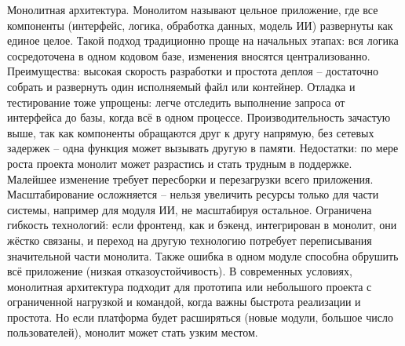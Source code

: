 Монолитная архитектура. Монолитом называют цельное приложение, где все компоненты (интерфейс, логика, обработка данных, модель ИИ) развернуты как единое целое. Такой подход традиционно проще на начальных этапах: вся логика сосредоточена в одном кодовом базе, изменения вносятся централизованно. Преимущества: высокая скорость разработки и простота деплоя – достаточно собрать и развернуть один исполняемый файл или контейнер\cite{atlassian:microservices}. Отладка и тестирование тоже упрощены: легче отследить выполнение запроса от интерфейса до базы, когда всё в одном процессе\cite{atlassian:microservices}.  Производительность зачастую выше, так как компоненты обращаются друг к другу напрямую, без сетевых задержек – одна функция может вызывать другую в памяти. Недостатки: по мере роста проекта монолит может разрастись и стать трудным в поддержке. Малейшее изменение требует пересборки и перезагрузки всего приложения\cite{atlassian:microservices}. Масштабирование осложняется – нельзя увеличить ресурсы только для части системы, например для модуля ИИ, не масштабируя остальное. Ограничена гибкость технологий: если фронтенд, как и бэкенд,  интегрирован в монолит, они жёстко связаны, и переход на другую технологию потребует переписывания значительной части монолита. Также ошибка в одном модуле способна обрушить всё приложение (низкая отказоустойчивость)\cite{atlassian:microservices}. В современных условиях, монолитная архитектура подходит для прототипа или небольшого проекта с ограниченной нагрузкой и командой, когда важны быстрота реализации и простота. Но если платформа будет расширяться (новые модули, большое число пользователей), монолит может стать узким местом.


